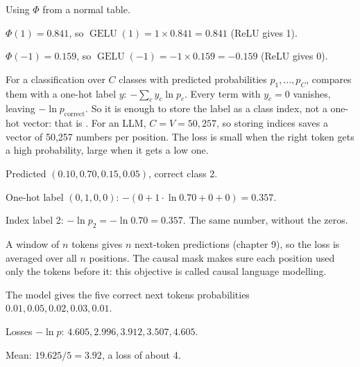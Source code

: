 \begin{example}[GELU at $\pm 1$]
Using $\Phi$ from a normal table.
\begin{steps}
  \item $\Phi(1) = 0.841$, so $\operatorname{GELU}(1) = 1 \times 0.841 = 0.841$ (ReLU gives 1).
  \item $\Phi(-1) = 0.159$, so $\operatorname{GELU}(-1) = -1 \times 0.159 = -0.159$ (ReLU gives 0).
\end{steps}
\end{example}

\begin{definition}
For a classification over $C$ classes with predicted probabilities $p_1, \dots, p_C$,  compares them with a one-hot label $y$: $-\sum_c y_c \ln p_c$. Every term with $y_c = 0$ vanishes, leaving $-\ln p_{\text{correct}}$. So it is enough to store the label as a class index, not a one-hot vector: that is . For an LLM, $C = V = 50{,}257$, so storing indices saves a vector of 50,257 numbers per position. The loss is small when the right token gets a high probability, large when it gets a low one.
\end{definition}

\begin{example}
Predicted $(0.10, 0.70, 0.15, 0.05)$, correct class 2.
\begin{steps}
  \item One-hot label $(0, 1, 0, 0)$: $-(0 + 1 \cdot \ln 0.70 + 0 + 0) = 0.357$.
  \item Index label 2: $-\ln p_2 = -\ln 0.70 = 0.357$. The same number, without the zeros.
\end{steps}
\end{example}

\begin{remark}
A window of $n$ tokens gives $n$ next-token predictions (chapter 9), so the loss is averaged over all $n$ positions. The causal mask makes sure each position used only the tokens before it: this objective is called causal language modelling.
\end{remark}

\begin{example}
The model gives the five correct next tokens probabilities $0.01, 0.05, 0.02, 0.03, 0.01$.
\begin{steps}
  \item Losses $-\ln p$: $4.605, 2.996, 3.912, 3.507, 4.605$.
  \item Mean: $19.625/5 = 3.92$, a loss of about 4.
\end{steps}
\end{example}

